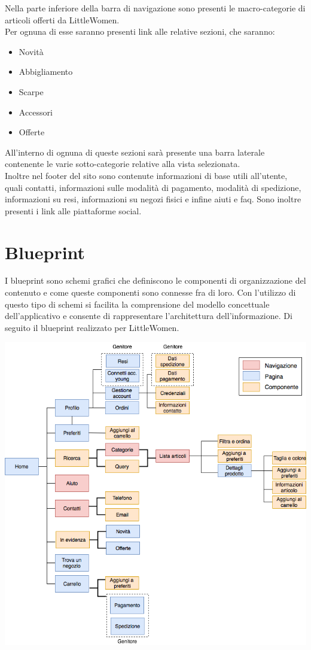 \documentclass[12pt,a4paper]{report}
\begin{document}
Nella parte inferiore della barra di navigazione sono presenti le macro-categorie di articoli offerti da LittleWomen.\\ Per ognuna di esse saranno presenti link alle relative sezioni, che saranno:
\begin{itemize}
  \item Novità
  \item Abbigliamento
  \item Scarpe
  \item Accessori
  \item Offerte
\end{itemize}
All'interno di ognuna di queste sezioni sarà presente una barra laterale contenente le varie sotto-categorie relative alla vista selezionata. \\
Inoltre nel footer del sito sono contenute informazioni di base utili all'utente, quali contatti, informazioni sulle modalità di pagamento, modalità di spedizione, informazioni su resi, informazioni su negozi fisici e infine aiuti e faq. Sono inoltre presenti i link alle piattaforme social.
\section{Blueprint}
I blueprint sono schemi grafici che definiscono le componenti di organizzazione del contenuto e come queste componenti sono connesse fra di loro. Con l'utilizzo di questo tipo di schemi si facilita la comprensione del modello concettuale dell'applicativo e consente di rappresentare l'architettura dell'informazione. Di seguito il blueprint realizzato per LittleWomen.\\
\begin{center}
  \includegraphics[width=1\textwidth]{"Project Management Sources/Wireframe/Blueprint"}
\end{center}
\newpage
\end{document}
